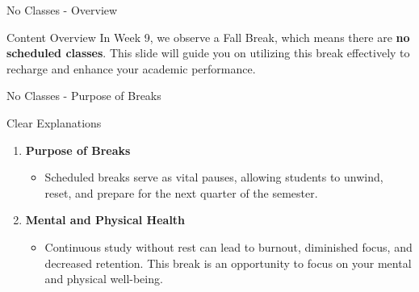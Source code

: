 \documentclass[aspectratio=169]{beamer}
\begin{document}
\begin{frame}[fragile]{No Classes - Overview}
    \begin{block}{Content Overview}
        In Week 9, we observe a Fall Break, which means there are \textbf{no scheduled classes}. This slide will guide you on utilizing this break effectively to recharge and enhance your academic performance.
    \end{block}
\end{frame}

\begin{frame}[fragile]{No Classes - Purpose of Breaks}
    \begin{block}{Clear Explanations}
        \begin{enumerate}
            \item \textbf{Purpose of Breaks}
            \begin{itemize}
                \item Scheduled breaks serve as vital pauses, allowing students to unwind, reset, and prepare for the next quarter of the semester.
            \end{itemize}
    
            \item \textbf{Mental and Physical Health}
            \begin{itemize}
                \item Continuous study without rest can lead to burnout, diminished focus, and decreased retention. This break is an opportunity to focus on your mental and physical well-being.
            \end{itemize}
        \end{enumerate}
    \end{block}
\end{frame}
\end{document}
